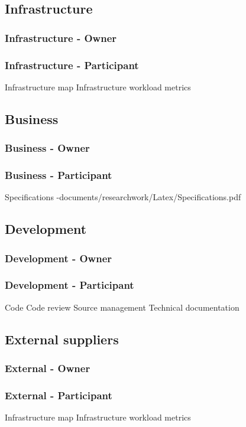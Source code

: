 \documentclass[8pt]{article} %
\begin{document}
\subsection{Infrastructure}
\subsubsection{Infrastructure - Owner}
\subsubsection{Infrastructure - Participant}
Infrastructure map
Infrastructure workload metrics

\subsection{Business}
\subsubsection{Business - Owner}
\subsubsection{Business - Participant}
Specifications -documents/researchwork/Latex/Specifications.pdf

\subsection{Development}
\subsubsection{Development - Owner}
\subsubsection{Development - Participant}
Code
Code review
Source management
Technical documentation

\subsection{External suppliers}
\subsubsection{External - Owner}
\subsubsection{External - Participant}
Infrastructure map
Infrastructure workload metrics
\end{document}
